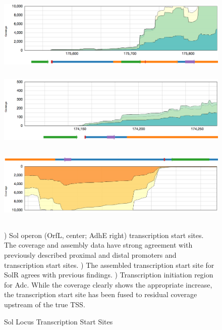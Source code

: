 \begin{figure}
\small
{\includegraphics[width=\textwidth,height=1.5in]{images/Assembly/Sol/Sol-TSS.png}
\label{fig:2a}}
{\includegraphics[width=\textwidth,height=1.5in]{images/Assembly/Sol/Sol-SolR-TSS.png}
\label{fig:2b}}
{\includegraphics[width=\textwidth,height=1.5in]{images/Assembly/Sol/Sol-Adc-TSS.png}
\label{fig:2c}}
\caption{Sol Locus Transcription Start Sites} ) Sol operon (OrfL, center; AdhE right) transcription start sites. The coverage and assembly data have strong agreement with previously described proximal and distal promoters and transcription start sites. ) The assembled transcription start site for SolR agrees with previous findings. ) Transcription initiation region for Adc. While the coverage clearly shows the appropriate increase, the transcription start site has been fused to residual coverage upstream of the true TSS. 
\end{figure}
